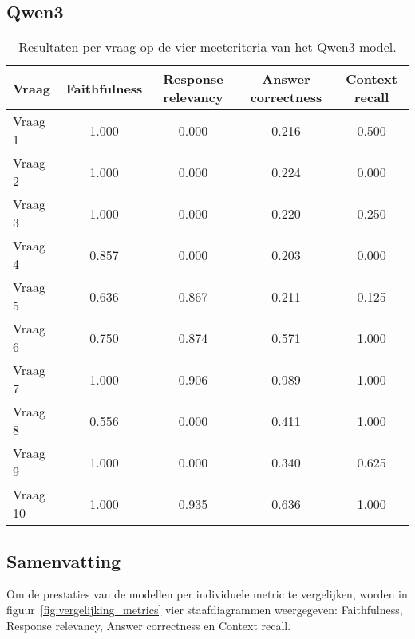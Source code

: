 \subsection{Qwen3}

\begin{table}[H]
    \begin{tabular}{|l|c|c|c|c|}
        \hline
        \textbf{Vraag} & \textbf{Faithfulness} & \textbf{Response relevancy} & \textbf{Answer correctness} & \textbf{Context recall} \\
        \hline
        Vraag 1  & 1.000 & 0.000 & 0.216 & 0.500 \\
        Vraag 2  & 1.000 & 0.000 & 0.224 & 0.000 \\
        Vraag 3  & 1.000 & 0.000 & 0.220 & 0.250 \\
        Vraag 4  & 0.857 & 0.000 & 0.203 & 0.000 \\
        Vraag 5  & 0.636 & 0.867 & 0.211 & 0.125 \\
        Vraag 6  & 0.750 & 0.874 & 0.571 & 1.000 \\
        Vraag 7  & 1.000 & 0.906 & 0.989 & 1.000 \\
        Vraag 8  & 0.556 & 0.000 & 0.411 & 1.000 \\
        Vraag 9  & 1.000 & 0.000 & 0.340 & 0.625 \\
        Vraag 10 & 1.000 & 0.935 & 0.636 & 1.000 \\
        \hline
    \end{tabular}
    \caption{Resultaten per vraag op de vier meetcriteria van het Qwen3 model.}
    \label{tab:resultaten_vragen_qwen3}
\end{table}


\subsection{Samenvatting}

Om de prestaties van de modellen per individuele metric te vergelijken, worden in figuur~\ref{fig:vergelijking_metrics} vier staafdiagrammen weergegeven: Faithfulness, Response relevancy, Answer correctness en Context recall.

